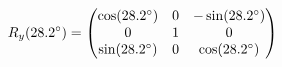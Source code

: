 \documentclass[preview]{standalone}
\begin{document}
\begin{align*}
\special{dvisvgm:raw <g id='unique000'>}R_y(28.2^\circ) = \begin{pmatrix} \cos(28.2^\circ) & 0 & -\sin(28.2^\circ) \\ 0 & 1 & 0 \\ \sin(28.2^\circ) & 0 & \cos(28.2^\circ) \end{pmatrix}\special{dvisvgm:raw </g>}
\end{align*}
\end{document}
